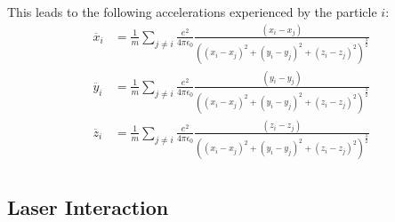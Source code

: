 \documentclass[a4paper,10pt]{article}
\begin{document}
This leads to the following accelerations experienced by the particle $i$:
\begin{align}
\ddot{x_i}&=\frac{1}{m} \displaystyle\sum_{j \neq i}\frac{e^2}{4 \pi \epsilon_0} \frac{(x_i - x_j)}{\left((x_i - x_j)^2 + (y_i - y_j)^2 +  (z_i - z_j)^2\right)^{\frac{3}{2}}}\\
\ddot{y_i}&=\frac{1}{m} \displaystyle\sum_{j \neq i}\frac{e^2}{4 \pi \epsilon_0} \frac{(y_i - y_j)}{\left((x_i - x_j)^2 + (y_i - y_j)^2 +  (z_i - z_j)^2\right)^{\frac{3}{2}}}\\
\ddot{z_i}&=\frac{1}{m} \displaystyle\sum_{j \neq i}\frac{e^2}{4 \pi \epsilon_0} \frac{(z_i - z_j)}{\left((x_i - x_j)^2 + (y_i - y_j)^2 +  (z_i - z_j)^2\right)^{\frac{3}{2}}}\\
\end{align}

\subsection{Laser Interaction}
\end{document}

